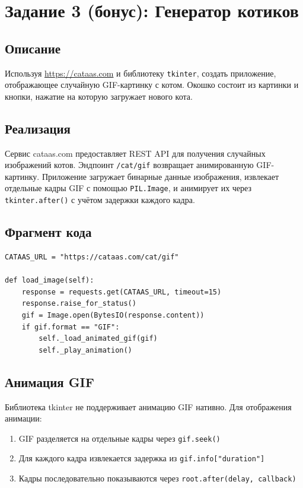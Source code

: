 \documentclass[12pt,a4paper]{article}
\begin{document}
\section*{Задание 3 (бонус): Генератор котиков}
\subsection*{Описание}
Используя \url{https://cataas.com} и библиотеку \texttt{tkinter}, создать приложение, отображающее случайную GIF-картинку с котом. Окошко состоит из картинки и кнопки, нажатие на которую загружает нового кота.

\subsection*{Реализация}
Сервис cataas.com предоставляет REST API для получения случайных изображений котов. Эндпоинт \texttt{/cat/gif} возвращает анимированную GIF-картинку. Приложение загружает бинарные данные изображения, извлекает отдельные кадры GIF с помощью \texttt{PIL.Image}, и анимирует их через \texttt{tkinter.after()} с учётом задержки каждого кадра.

\subsection*{Фрагмент кода}
\begin{lstlisting}
CATAAS_URL = "https://cataas.com/cat/gif"

def load_image(self):
    response = requests.get(CATAAS_URL, timeout=15)
    response.raise_for_status()
    gif = Image.open(BytesIO(response.content))
    if gif.format == "GIF":
        self._load_animated_gif(gif)
        self._play_animation()
\end{lstlisting}

\subsection*{Анимация GIF}
Библиотека tkinter не поддерживает анимацию GIF нативно. Для отображения анимации:
\begin{enumerate}
    \item GIF разделяется на отдельные кадры через \texttt{gif.seek()}
    \item Для каждого кадра извлекается задержка из \texttt{gif.info["duration"]}
    \item Кадры последовательно показываются через \texttt{root.after(delay, callback)}
\end{enumerate}
\end{document}
